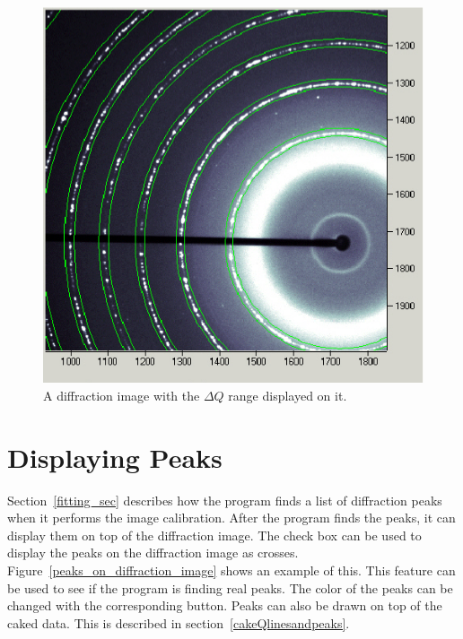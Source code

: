 \begin{figure}
    \centering
    \includegraphics[scale=.75]
    {figures/constant_dq_lines_on_diffraction_image.eps}
    \caption{A diffraction image with the $\Delta Q$ range 
    displayed on it.}
    \label{constant_dq_lines_on_diffraction_image}
\end{figure}

\section{Displaying Peaks}
    \label{displaying_peaks_diffraction}

Section~\ref{fitting_sec} describes how the 
program finds a list of diffraction peaks 
when it performs the image calibration.  
After the program finds the peaks, it can display 
them on top of the diffraction image. 
The  check box can be used to 
display the peaks on the diffraction image as crosses. 
Figure~\ref{peaks_on_diffraction_image} shows 
an example of this. This feature can be used
to see if the program is finding real peaks.
The color of the peaks can be changed with the 
corresponding  button.  
Peaks can also be drawn on top of the caked data. This 
is described in section~\ref{cakeQlinesandpeaks}.

